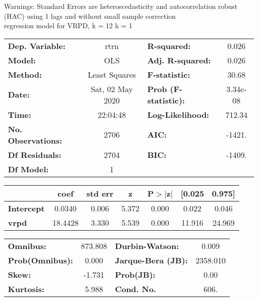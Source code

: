 Warnings: \newline
 [1] Standard Errors are heteroscedasticity and autocorrelation robust (HAC) using 1 lags and without small sample correction\\ 

regression model for VRPD, k = 12 h = 1\begin{center}
\begin{tabular}{lclc}
\toprule
\textbf{Dep. Variable:}    &       rtrn       & \textbf{  R-squared:         } &     0.026   \\
\textbf{Model:}            &       OLS        & \textbf{  Adj. R-squared:    } &     0.026   \\
\textbf{Method:}           &  Least Squares   & \textbf{  F-statistic:       } &     30.68   \\
\textbf{Date:}             & Sat, 02 May 2020 & \textbf{  Prob (F-statistic):} &  3.34e-08   \\
\textbf{Time:}             &     22:04:48     & \textbf{  Log-Likelihood:    } &    712.34   \\
\textbf{No. Observations:} &        2706      & \textbf{  AIC:               } &    -1421.   \\
\textbf{Df Residuals:}     &        2704      & \textbf{  BIC:               } &    -1409.   \\
\textbf{Df Model:}         &           1      & \textbf{                     } &             \\
\bottomrule
\end{tabular}
\begin{tabular}{lcccccc}
                   & \textbf{coef} & \textbf{std err} & \textbf{z} & \textbf{P$> |$z$|$} & \textbf{[0.025} & \textbf{0.975]}  \\
\midrule
\textbf{Intercept} &       0.0340  &        0.006     &     5.372  &         0.000        &        0.022    &        0.046     \\
\textbf{vrpd}      &      18.4428  &        3.330     &     5.539  &         0.000        &       11.916    &       24.969     \\
\bottomrule
\end{tabular}
\begin{tabular}{lclc}
\textbf{Omnibus:}       & 873.808 & \textbf{  Durbin-Watson:     } &    0.009  \\
\textbf{Prob(Omnibus):} &   0.000 & \textbf{  Jarque-Bera (JB):  } & 2358.010  \\
\textbf{Skew:}          &  -1.731 & \textbf{  Prob(JB):          } &     0.00  \\
\textbf{Kurtosis:}      &   5.988 & \textbf{  Cond. No.          } &     606.  \\
\bottomrule
\end{tabular}
\end{center}

